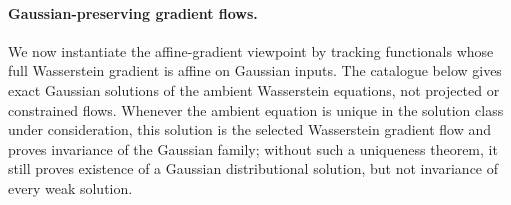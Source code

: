 \paragraph{Gaussian-preserving gradient flows.}

We now instantiate the affine-gradient viewpoint by tracking functionals whose full Wasserstein gradient is affine on Gaussian inputs. The catalogue below gives exact Gaussian solutions of the ambient Wasserstein equations, not projected or constrained flows. Whenever the ambient equation is unique in the solution class under consideration, this solution is the selected Wasserstein gradient flow and proves invariance of the Gaussian family; without such a uniqueness theorem, it still proves existence of a Gaussian distributional solution, but not invariance of every weak solution.

